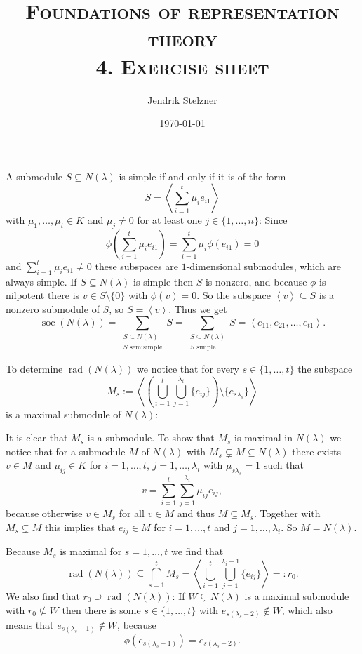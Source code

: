 \documentclass[a4paper,10pt]{article}
\title{\textsc{Foundations of representation theory \\ \Large 4. Exercise sheet}}
\author{Jendrik Stelzner}
\date{\today}
\theoremstyle{definition}
\newcommand{\soc}{\operatorname{soc}}
\newcommand{\rad}{\operatorname{rad}}
\newcommand{\gen}[1]{\left\langle#1\right\rangle}
\begin{document}
\maketitle





\section{}
A submodule $S \subseteq N(\lambda)$ is simple if and only if it is of the form
\[
 S = \gen{\sum_{i=1}^t \mu_i e_{i 1}}
\]
with $\mu_1, \ldots, \mu_t \in K$ and $\mu_j \neq 0$ for at least one $j \in \{1,\ldots,n\}$:
Since
\[
 \phi\left(\sum_{i=1}^t \mu_i e_{i 1}\right) = \sum_{i=1}^t \mu_i \phi(e_{i 1}) = 0
\]
and $\sum_{i=1}^t \mu_i e_{i 1} \neq 0$ these subspaces are $1$-dimensional submodules, which are always simple. If $S \subseteq N(\lambda)$ is simple then $S$ is nonzero, and because $\phi$ is nilpotent there is $v \in S\setminus\{0\}$ with $\phi(v) = 0$. So the subspace $\gen{v} \subseteq S$ is a nonzero submodule of $S$, so $S = \gen{v}$.
Thus we get
\[
 \soc(N(\lambda))
 = \sum_{\substack{S \subseteq N(\lambda) \\ S \text{ semisimple}}} S
 = \sum_{\substack{S \subseteq N(\lambda) \\ S \text{ simple}}} S
 = \gen{e_{1 1}, e_{2 1}, \ldots, e_{t 1}}.
\]

To determine $\rad(N(\lambda))$ we notice that for every $s \in \{1, \ldots, t\}$ the subspace
\[
 M_s := \gen{ \left(\bigcup_{i=1}^t \bigcup_{j=1}^{\lambda_i} \{e_{ij}\}\right) \setminus \{e_{s \lambda_s}\} }
\]
is a maximal submodule of $N(\lambda)$:

It is clear that $M_s$ is a submodule. To show that $M_s$ is maximal in $N(\lambda)$ we notice that for a submodule $M$ of $N(\lambda)$ with $M_s \subsetneq M \subseteq N(\lambda)$ there exists $v \in M$ and $\mu_{ij} \in K$ for $i=1,\ldots,t$, $j=1,\ldots,\lambda_i$ with $\mu_{s \lambda_s} = 1$ such that
\[
 v = \sum_{i=1}^t \sum_{j=1}^{\lambda_i} \mu_{ij} e_{ij},
\]
because otherwise $v \in M_s$ for all $v \in M$ and thus $M \subseteq M_s$. Together with $M_s \subsetneq M$ this implies that $e_{ij} \in M$ for $i=1,\ldots,t$ and $j=1,\ldots,\lambda_i$. So $M = N(\lambda)$.

Because $M_s$ is maximal for $s = 1,\ldots,t$ we find that
\[
 \rad(N(\lambda))
 \subseteq \bigcap_{s=1}^t M_s
 = \gen{ \bigcup_{i=1}^t \bigcup_{j=1}^{\lambda_i-1} \{e_{ij}\} } =: r_0.
\]
We also find that $r_0 \supseteq \rad(N(\lambda))$: If $W \subsetneq N(\lambda)$ is a maximal submodule with $r_0 \nsubseteq W$ then there is some $s \in \{1,\ldots,t\}$ with $e_{s (\lambda_s-2)} \not\in W$, which also means that $e_{s (\lambda_s-1)} \not\in W$, because
\[
 \phi(e_{s (\lambda_s-1)}) = e_{s (\lambda_s-2)}.
\]
\end{document}
